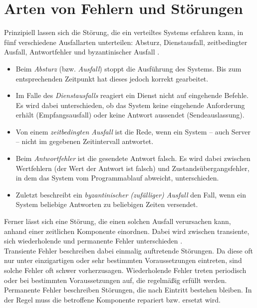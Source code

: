 \documentclass[12pt,a4paper,parskip=half]{scrreprt}
\begin{document}
		\section{Arten von Fehlern und Störungen}
			
			Prinzipiell lassen sich die Störung, die ein verteiltes Systems erfahren kann, in fünf verschiedene Ausfallarten unterteilen: Absturz, Dienstausfall, zeitbedingter Ausfall, Antwortfehler und byzantinischer Ausfall \cite{vS-TU-Braunschweig} \cite{vS-Dillinger}.
			
			\begin{itemize}
				\item Beim \textit{Absturz} (bzw. \textit{Ausfall}) stoppt die Ausführung des Systems. Bis zum entsprechenden Zeitpunkt hat dieses jedoch korrekt gearbeitet.
				\item Im Falle des \textit{Dienstausfalls} reagiert ein Dienst nicht auf eingehende Befehle. Es wird dabei unterschieden, ob das System keine eingehende Anforderung erhält (Empfangsausfall) oder keine Antwort aussendet (Sendeauslassung).
				\item Von einem \textit{zeitbedingten Ausfall} ist die Rede, wenn ein System -- auch Server -- nicht im gegebenen Zeitintervall antwortet.
				\item Beim \textit{Antwortfehler} ist die gesendete Antwort falsch. Es wird dabei zwischen Wertfehlern (der Wert der Antwort ist falsch) und Zustandsübergangsfehler, in dem das System vom Programmablauf abweicht, unterschieden.
				\item Zuletzt beschreibt ein \textit{byzantinischer (zufälliger) Ausfall} den Fall, wenn ein System beliebige Antworten zu beliebigen Zeiten versendet.
			\end{itemize}
			
			Ferner lässt sich eine Störung, die einen solchen Ausfall verursachen kann, anhand einer zeitlichen Komponente einordnen. Dabei wird zwischen transiente, sich wiederholende und permanente Fehler unterschieden \cite{vS-Dillinger}. \\
			Transiente Fehler beschreiben dabei einmalig auftretende Störungen. Da diese oft nur unter einzigartigen oder sehr bestimmten Voraussetzungen eintreten, sind solche Fehler oft schwer vorherzusagen. Wiederholende Fehler treten periodisch oder bei bestimmten Voraussetzungen auf, die regelmäßig erfüllt werden. Permanente Fehler beschreiben Störungen, die nach Eintritt bestehen bleiben. In der Regel muss die betroffene Komponente repariert bzw. ersetzt wird.
	
\end{document}
